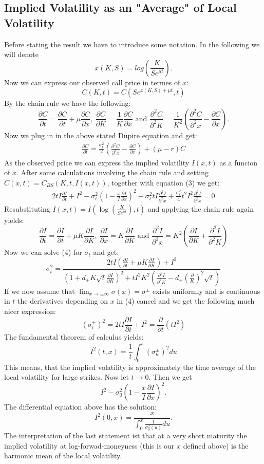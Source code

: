 \documentclass[12pt]{article}
\newcommand{\C}{C_{BS}}
\newcommand{\p}{\partial}
\begin{document}
\subsection{Implied Volatility as an "Average" of Local Volatility}
Before stating the result we have to introduce some notation. In the following we will denote 
$$x(K,S)=log(\frac{K}{Se^{\mu t}}).$$
Now we can express our observed call price in termes of $x$:
$$C(K,t)=C(Se^{x(K,S)+\mu t},t)$$
By the chain rule we have the following:
$$\frac{\p C}{\p t}=\frac{\p C}{\p t}+\mu\frac{\p C}{\p x},~\frac{\p C}{\p K}=\frac{1}{K}\frac{\p C}{\p x}\text{ and }\frac{\p^2 C}{\p^2 K}=\frac{1}{K^2}(\frac{\p^2 C}{\p^2 x}-\frac{\p C}{\p x}).$$
Now we plug in in the above stated Dupire equation and get:
\begin{align}\frac{\p C}{\p t}=\frac{\sigma_t^2}{2}(\frac{\p^2 C}{\p^2 x}-\frac{\p C}{\p x})+(\mu-r)C\end{align}
As the observed price we can express the implied volatility $I(x,t)$ as a funcion of $x$. After some calculations involving the chain rule and setting $C(x,t)=\C(K,t,I(x,t))$, together with equation (3) we get:
\begin{align}2tI\frac{\p I}{\p t}+I^2-\sigma_t^2(1-\frac{x}{I}\frac{\p I}{\p x})^2-\sigma_t^2 t I\frac{\p^2 I}{\p^2 x}+ \frac{\sigma_t^2}{4}t^2I^2\frac{\p^2I}{\p^2x}=0\end{align}
Resubstituting $I(x,t)=I(\log(\frac{K}{Se^{\mu t}}),t)$ and applying the chain rule again yields:
$$\frac{\p I}{\p t}= \frac{\p I}{\p t}+\mu K \frac{\p I}{\p K},~ \frac{\p I}{\p x}= K\frac{\p I}{\p K}\text{ and } \frac{\p^2 I}{\p^2 x}=K^2(\frac{\p I}{\p K}+\frac{\p^2 I}{\p^2 K})$$
Now we can solve (4) for $\sigma_t$ and get:
$$\sigma_t^2=\frac{2tI(\frac{\p I}{\p t}+\mu K\frac{\p I}{\p K})+I^2}{(1+d_+K\sqrt{t}\frac{\p I}{\p K})^2 + tI^2K^2(\frac{\p^2 I}{\p^2 K}-d_+(\frac{\p}{K})^2\sqrt{t})}$$
If we now assume that $\lim_{x \rightarrow \pm \infty}\sigma(x)=\sigma^\pm$ exists uniformly and is continuous in $t$ the derivatives depending on $x$ in (4) cancel and we get the following much nicer expression:
$$(\sigma_t^\pm)^2=2tI\frac{\partial I}{\partial t} + I^2=\frac{\partial}{\partial t}(tI^2)$$
The fundamental theorem of calculus yields:
$$I^2(t,x)=\frac{1}{t}\int_{0}^t(\sigma_u^\pm)^2du$$
This means, that the implied volatility is approximately the time average of the local volatility for large strikes.
Now let $t \rightarrow 0$. Then we get
$$I^2-\sigma_0^2( 1-\frac{x}{I}\frac{\partial I}{\partial x})^2.$$
The differential equation above has the solution:
$$I^2(0,x)=\frac{x}{\int_0^x\frac{1}{\sigma_0^2(u)}du}.$$
The interpretation of the last statement ist that at a very short maturity the implied volatility at log-forwad-moneyness (this is our $x$ defined above) is the harmonic mean of the local volatility.
\end{document}
